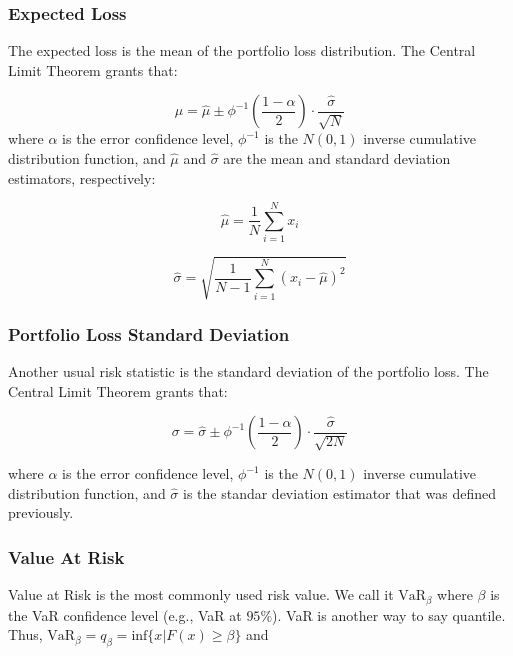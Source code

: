 \documentclass[a4paper,12pt,final]{article}
\begin{document}
\subsubsection{Expected Loss}
The expected loss is the mean of the portfolio loss distribution.
The Central Limit Theorem \cite{stats:schaum} grants that:

\begin{displaymath}
\mu = \widehat{\mu} \pm \phi^{-1}\left(\frac{1-\alpha}{2}\right) \cdot \frac{\widehat{\sigma}}{\sqrt{N}}
\end{displaymath}
where $\alpha$ is the error confidence level, $\phi^{-1}$ is the $N(0,1)$ inverse 
cumulative distribution function, and $\widehat{\mu}$ and $\widehat{\sigma}$ are 
the mean and standard deviation estimators, respectively:

\begin{displaymath}
\widehat{\mu} = \frac{1}{N} \sum_{i=1}^{N} x_i
\end{displaymath}

\begin{displaymath}
\widehat{\sigma} =
\sqrt{\frac{1}{N-1} \sum_{i=1}^{N} \left( x_i - \widehat{\mu} \right)^2}
\end{displaymath}

\subsubsection{Portfolio Loss Standard Deviation}
Another usual risk statistic is the standard deviation of the portfolio loss.
The Central Limit Theorem \cite{stats:schaum} grants that:

\begin{displaymath}
\sigma = \widehat{\sigma} \pm \phi^{-1}\left(\frac{1-\alpha}{2}\right) \cdot \frac{\widehat{\sigma}}{\sqrt{2N}}
\end{displaymath}

where $\alpha$ is the error confidence level, $\phi^{-1}$ is the $N(0,1)$ inverse 
cumulative distribution function, and $\widehat{\sigma}$ is the standar deviation 
estimator that was defined previously.

\subsubsection{Value At Risk}
Value at Risk \cite{var:jorion} is the most commonly used risk value. We call it 
$\textrm{VaR}_{\beta}$ where $\beta$ is the VaR confidence level (e.g., VaR at $95\%$).
VaR is another way to say quantile. Thus,
$\textrm{VaR}_{\beta} = q_{\beta} = \textrm{inf}\{x | F(x) \geq \beta \}$ and
\end{document}
